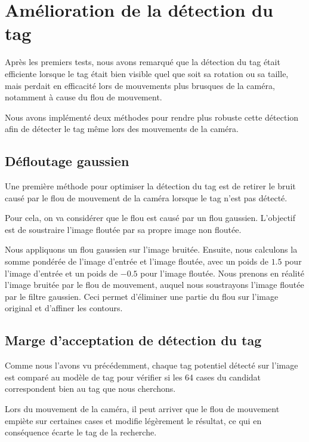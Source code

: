     
    \section{Amélioration de la détection du tag}

    Après les premiers tests, nous avons remarqué que la détection du tag était efficiente lorsque le tag était bien visible quel que soit sa rotation ou sa taille, mais perdait en efficacité lors de mouvements plus brusques de la caméra, notamment à cause du flou de mouvement.

    Nous avons implémenté deux méthodes pour rendre plus robuste cette détection afin de détecter le tag même lors des mouvements de la caméra.

        \subsection{Défloutage gaussien}

        Une première méthode pour optimiser la détection du tag est de retirer le bruit causé par le flou de mouvement de la caméra lorsque le tag n'est pas détecté.

        Pour cela, on va considérer que le flou est causé par un flou gaussien. L'objectif est de soustraire l'image floutée par sa propre image non floutée.

        Nous appliquons un flou gaussien sur l'image bruitée. Ensuite, nous calculons la somme pondérée de l'image d'entrée et l'image floutée, avec un poids de $1.5$ pour l'image d'entrée et un poids de $-0.5$ pour l'image floutée. Nous prenons en réalité l'image bruitée par le flou de mouvement, auquel nous soustrayons l'image floutée par le filtre gaussien. Ceci permet d'éliminer une partie du flou sur l'image original et d'affiner les contours.

        \subsection{Marge d'acceptation de détection du tag}

        Comme nous l'avons vu précédemment, chaque tag potentiel détecté sur l'image est comparé au modèle de tag pour vérifier si les 64 cases du candidat correspondent bien au tag que nous cherchons.

        Lors du mouvement de la caméra, il peut arriver que le flou de mouvement empiète sur certaines cases et modifie légèrement le résultat, ce qui en conséquence écarte le tag de la recherche.

